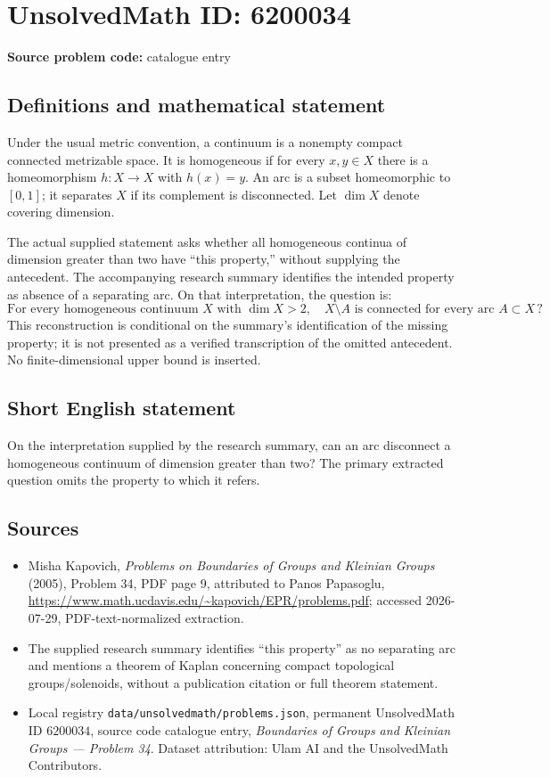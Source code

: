 \documentclass[11pt]{article}
\begin{document}
\section*{UnsolvedMath ID: 6200034}
\textbf{Source problem code:} catalogue entry
\subsection{Definitions and mathematical statement}
Under the usual metric convention, a continuum is a nonempty compact connected metrizable space. It is homogeneous if for every $x,y\in X$ there is a homeomorphism $h:X\to X$ with $h(x)=y$. An arc is a subset homeomorphic to $[0,1]$; it separates $X$ if its complement is disconnected. Let $\dim X$ denote covering dimension.

The actual supplied statement asks whether all homogeneous continua of dimension greater than two have ``this property,'' without supplying the antecedent. The accompanying research summary identifies the intended property as absence of a separating arc. On that interpretation, the question is:
\[
\text{For every homogeneous continuum }X\text{ with }\dim X>2,
\quad X\setminus A\text{ is connected for every arc }A\subset X\,?
\]
This reconstruction is conditional on the summary's identification of the missing property; it is not presented as a verified transcription of the omitted antecedent. No finite-dimensional upper bound is inserted.
\subsection{Short English statement}
On the interpretation supplied by the research summary, can an arc disconnect a homogeneous continuum of dimension greater than two? The primary extracted question omits the property to which it refers.
\subsection{Sources}
\begin{itemize}
\item Misha Kapovich, \emph{Problems on Boundaries of Groups and Kleinian Groups} (2005), Problem 34, PDF page 9, attributed to Panos Papasoglu, \url{https://www.math.ucdavis.edu/~kapovich/EPR/problems.pdf}; accessed 2026-07-29, PDF-text-normalized extraction.
\item The supplied research summary identifies ``this property'' as no separating arc and mentions a theorem of Kaplan concerning compact topological groups/solenoids, without a publication citation or full theorem statement.
\item Local registry \texttt{data/unsolvedmath/problems.json}, permanent UnsolvedMath ID $6200034$, source code catalogue entry, \emph{Boundaries of Groups and Kleinian Groups --- Problem 34}. Dataset attribution: Ulam AI and the UnsolvedMath Contributors.
\end{itemize}
\end{document}
